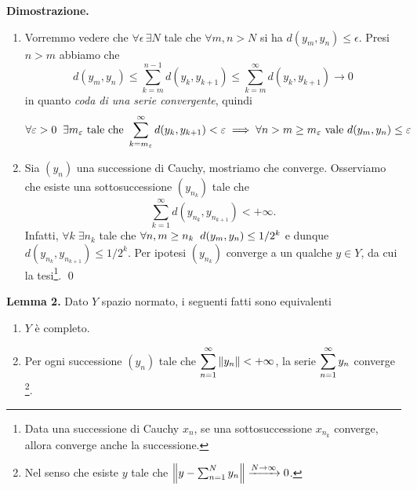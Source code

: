 \textbf{Dimostrazione.}
\begin{enumerate}
	\item Vorremmo vedere che $\forall \epsilon \, \exists N$ tale che $\forall m, n > N$ si ha $d(y_m, y_n) \leq \epsilon$. 
		Presi $n > m$ abbiamo che 
		$$
		d(y_m, y_n) \leq \sum_{k=m}^{n-1} d(y_k, y_{k+1}) \leq \sum_{k=m}^\infty d(y_k, y_{k+1}) \to 0
		$$
		in quanto \textit{coda di una serie convergente}, quindi 
		$$
		\forall \varepsilon > 0 \;\; \exists m_\varepsilon \text{ tale che } \sum_{k = m_\varepsilon}^\infty d(y_k, y_{k+1})< \varepsilon \implies \forall n > m \geq m_\varepsilon \text{ vale } d(y_m, y_n) \leq \varepsilon
		$$ 

	\item
		Sia $(y_n)$ una successione di Cauchy, mostriamo che converge.
		Osserviamo che esiste una sottosuccessione $\left( y_{n_k} \right)$ tale che
		$$
			\sum_{k=1}^\infty d(y_{n_k}, y_{n_{k+1}}) < +\infty.
		$$
		Infatti, $\forall k \; \exists n_k$ tale che $\forall n, m \geq n_k \;\; d(y_m, y_n) \leq 1 /2 ^k$ e dunque $d(y_{n_k}, y_{n_{k+1}}) \leq 1 / 2^k$.
		Per ipotesi $\left( y_{n_k} \right)$ converge a un qualche $y \in Y$, da cui la tesi\footnote{Data una successione di Cauchy $x_n$, se una sottosuccessione $x_{n_k}$ converge, allora converge anche la successione.}.
		\qed



\end{enumerate}



\hypertarget{prop:completeness_lemma_2}{}
\textbf{Lemma 2.} 
Dato $Y$ spazio normato, i seguenti fatti sono equivalenti
\begin{enumerate}
	\item $Y$ è completo.

	\item Per ogni successione $(y_n)$ tale che $\displaystyle \sum_{n=1}^\infty \left\lVert y_n \right\rVert < +\infty$, la serie $\displaystyle \sum_{n=1}^\infty y_n$ converge \footnote{Nel senso che esiste $y$ tale che $\left\lVert y - \sum_{n=1}^N y_n \right\rVert \xrightarrow{N \to \infty} 0$.}.
\end{enumerate}

